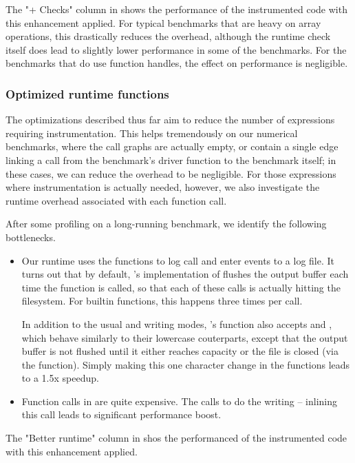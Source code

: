 The "+ Checks" column in  shows the
performance of the instrumented code with this enhancement applied. For typical
\matlab benchmarks that are heavy on array operations, this drastically reduces
the overhead, although the runtime check itself does lead to slightly lower
performance in some of the benchmarks. For the benchmarks that do use function
handles, the effect on performance is negligible.

\subsubsection{Optimized runtime functions}

The optimizations described thus far aim to reduce the number of expressions
requiring instrumentation. This helps tremendously on our numerical benchmarks,
where the call graphs are actually empty, or contain a single edge linking a
call from the benchmark's driver function to the benchmark itself; in these
cases, we can reduce the overhead to be negligible. For those expressions
where instrumentation is actually needed, however, we also investigate the
runtime overhead associated with each function call.

After some profiling on a long-running benchmark, we identify the following
bottlenecks.

\begin{itemize}
  \item Our runtime uses the  functions to log call and enter
    events to a log file. It turns out that by default, \matlab's
    implementation of  flushes the output buffer each time the
    function is called, so that each of these calls is actually hitting the
    filesystem. For builtin functions, this happens three times per call.

    In addition to the usual  and  writing modes,
    \matlab's  function also accepts  and ,
    which behave similarly to their lowercase couterparts, except that the
    output buffer is not flushed until it either reaches capacity or the file
    is closed (via the  function). Simply making this one
    character change in the  functions leads to
    a 1.5x speedup.

  \item Function calls in \matlab are quite expensive. The
     calls 
    to do the writing -- inlining this call leads to significant performance
    boost.
\end{itemize}

The "Better runtime" column in  shos
the performanced of the instrumented code with this enhancement applied.
